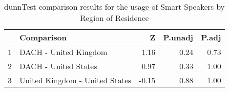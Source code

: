 \begin{table}[ht]
\centering
\begin{tabular}{rlrrr}
  \hline
 & Comparison & Z & P.unadj & P.adj \\ 
  \hline
1 & DACH - United Kingdom & 1.16 & 0.24 & 0.73 \\ 
  2 & DACH - United States & 0.97 & 0.33 & 1.00 \\ 
  3 & United Kingdom - United States & -0.15 & 0.88 & 1.00 \\ 
   \hline
\end{tabular}
\caption{dunnTest comparison results for the usage of Smart Speakers by Region of Residence} 
\end{table}
